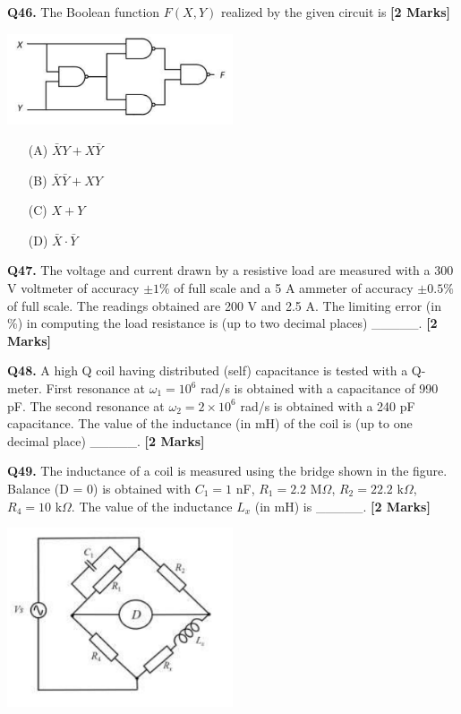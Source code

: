 \documentclass[11pt]{article}
\newcommand{\questionb}[2]{
    \noindent\textbf{Q#2.} #1 \hfill \textbf{[2 Marks]}
}
\begin{document}
\questionb{The Boolean function \(F(X, Y)\) realized by the given circuit is}{46}
\begin{center}
\includegraphics[width=0.5\textwidth]{figures/46.png}
\end{center}
\begin{enumerate}
    \item[(A)] \(\bar{X}Y + X\bar{Y}\)
    \item[(B)] \(\bar{X}\bar{Y} + XY\)
    \item[(C)] \(X + Y\)
    \item[(D)] \(\bar{X} \cdot \bar{Y}\)
\end{enumerate}
\vspace{0.5cm}

\questionb{The voltage and current drawn by a resistive load are measured with a 300 V voltmeter of accuracy \(\pm1\%\) of full scale and a 5 A ammeter of accuracy \(\pm0.5\%\) of full scale. The readings obtained are 200 V and 2.5 A. The limiting error (in \%) in computing the load resistance is (up to two decimal places) \_\_\_\_\_.}{47}
\vspace{0.5cm}

\questionb{A high Q coil having distributed (self) capacitance is tested with a Q-meter. First resonance at \(\omega_1 = 10^6\) rad/s is obtained with a capacitance of 990 pF. The second resonance at \(\omega_2 = 2 \times 10^6\) rad/s is obtained with a 240 pF capacitance. The value of the inductance (in mH) of the coil is (up to one decimal place) \_\_\_\_\_.}{48}
\vspace{0.5cm}

\questionb{The inductance of a coil is measured using the bridge shown in the figure. Balance (D = 0) is obtained with \(C_1 = 1\) nF, \(R_1 = 2.2\) M\(\Omega\), \(R_2 = 22.2\) k\(\Omega\), \(R_4 = 10\) k\(\Omega\). The value of the inductance \(L_x\) (in mH) is \_\_\_\_\_.}{49}
\begin{center}
\includegraphics[width=0.5\textwidth]{figures/49.png}
\end{center}
\vspace{0.5cm}
\end{document}
